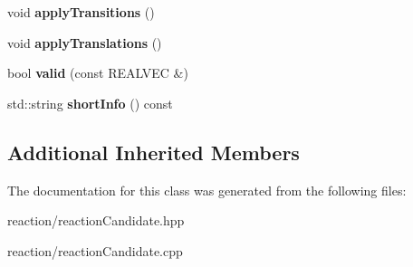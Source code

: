 \begin{DoxyCompactItemize}
\item 
\mbox{\label{classReactionCandidate_ac6125505b071fa735518bb7b9b7c0a6e}} 
void {\bfseries apply\+Transitions} ()
\item 
\mbox{\label{classReactionCandidate_a224f6dbafedbbb66e6b58389db328287}} 
void {\bfseries apply\+Translations} ()
\item 
\mbox{\label{classReactionCandidate_a80c2effc2e708c0474135808b34c209c}} 
bool {\bfseries valid} (const R\+E\+A\+L\+V\+EC \&)
\item 
\mbox{\label{classReactionCandidate_aef127b6ebd265c29d26c285bebb5dc57}} 
std\+::string {\bfseries short\+Info} () const
\end{DoxyCompactItemize}
\subsection*{Additional Inherited Members}


The documentation for this class was generated from the following files\+:\begin{DoxyCompactItemize}
\item 
reaction/reaction\+Candidate.\+hpp\item 
reaction/reaction\+Candidate.\+cpp\end{DoxyCompactItemize}
